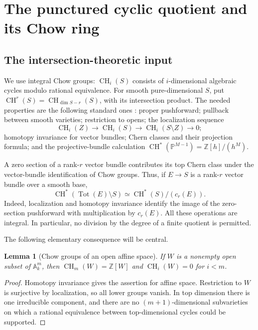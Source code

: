 \documentclass[11pt,a4paper]{article}
\newtheorem{lemma}[theorem]{Lemma}
\theoremstyle{definition}
\theoremstyle{remark}
\newcommand{\Z}{\mathbb Z}
\newcommand{\A}{\mathbb A}
\newcommand{\Pj}{\mathbb P}
\newcommand{\CH}{\operatorname{CH}}
\newcommand{\Tot}{\operatorname{Tot}}
\begin{document}
\section{The punctured cyclic quotient and its Chow ring}
\label{ka:sec:punctured}

\subsection{The intersection-theoretic input}
We use integral Chow groups: $\CH_i(S)$ consists of $i$-dimensional
algebraic cycles modulo rational equivalence. For smooth pure-dimensional
$S$, put $\CH^r(S)=\CH_{\dim S-r}(S)$, with its intersection product.
The needed properties are the following standard ones
\cite{ka:Fulton,ka:Totaro,ka:EdidinGraham}: proper pushforward; pullback between smooth varieties; restriction to
opens; the localization sequence
\begin{equation}
 \CH_i(Z)\longrightarrow\CH_i(S)\longrightarrow
 \CH_i(S\setminus Z)\longrightarrow0;
 \label{ka:eq:localization}
\end{equation}
homotopy invariance for vector bundles; Chern classes and their projection
formula; and the projective-bundle calculation
$\CH^*(\Pj^{M-1})=\Z[h]/(h^M)$.

A zero section of a rank-$r$ vector bundle contributes its top Chern
class under the vector-bundle identification of Chow groups. Thus, if
$E\to S$ is a rank-$r$ vector bundle over a smooth base,
\begin{equation}
 \CH^*(\Tot(E)\setminus S)
   \simeq \CH^*(S)/(c_r(E)).
 \label{ka:eq:eulerquotient}
\end{equation}
Indeed, localization and homotopy invariance identify the image of the
zero-section pushforward with multiplication by $c_r(E)$. All these
operations are integral. In particular, no division by the degree of a
finite quotient is permitted.

The following elementary consequence will be central.
\begin{lemma}[Chow groups of an open affine space]
\label{ka:lem:openaffine}
If $W$ is a nonempty open subset of $\A_k^m$, then
$\CH_m(W)=\Z[W]$ and $\CH_i(W)=0$ for $i<m$.
\end{lemma}
\begin{proof}
Homotopy invariance gives the assertion for affine space. Restriction to
$W$ is surjective by localization, so all lower groups vanish. In top
dimension there is one irreducible component, and there are no
$(m+1)$-dimensional subvarieties on which a rational equivalence between
top-dimensional cycles could be supported.
\end{proof}
\end{document}
